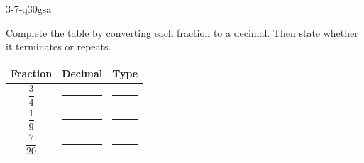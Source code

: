 \begin{practiceQuestion}{3-7-q30}{gsa}
\begin{questionText}
Complete the table by converting each fraction to a decimal. Then state whether it terminates or repeats.

\begin{center}
\begin{tabular}{|c|c|c|}
\hline
\textbf{Fraction} & \textbf{Decimal} & \textbf{Type} \\
\hline
$\dfrac{3}{4}$ & \rule{2cm}{0.4pt} & \rule{2cm}{0.4pt} \\[6pt]
\hline
$\dfrac{1}{9}$ & \rule{2cm}{0.4pt} & \rule{2cm}{0.4pt} \\[6pt]
\hline
$\dfrac{7}{20}$ & \rule{2cm}{0.4pt} & \rule{2cm}{0.4pt} \\[6pt]
\hline
\end{tabular}
\end{center}
\end{questionText}
\end{practiceQuestion}
